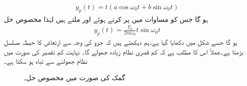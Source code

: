 \begin{align*}
y_p(t)=t(a\cos \omega_0 t +b\sin \omega_0 t)
\end{align*}
ہو گا جس کو مساوات  میں پر کرتے ہوئے  اور  ملتے ہیں لہٰذا مخصوص حل
\begin{align}
y_p(t)=\frac{F_0}{2m\omega_0} t \sin \omega_0t
\end{align}
ہو گا جسے شکل  میں دکھایا گیا ہے۔ہم دیکھتے ہیں کہ جزو  کی وجہ سے ارتعاش کا حیطہ مسلسل بڑھتا ہے۔عملاً اس کا مطلب ہے کہ کم قصری نظام زیادہ جھولے گا۔ نہایت کم تقصیر کی صورت میں نظام جھولنے سے تباہ ہو سکتا ہے۔
\begin{figure}
\centering
{}
\caption{گمک کی صورت میں مخصوص حل۔}
\label{شکل_سادہ_دو_گمک_مخصوص_حل}
\end{figure}

